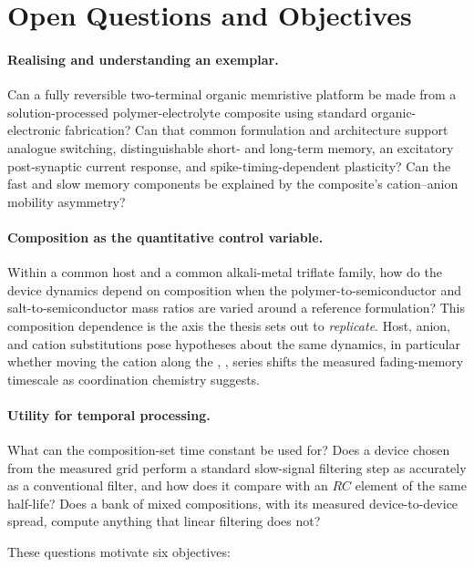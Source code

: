 \documentclass[12pt, twoside]{report}
\begin{document}
\section*{Open Questions and Objectives}
\label{subsec:open_questions}

\paragraph{Realising and understanding an exemplar.} Can a fully reversible two-terminal organic memristive platform be made from a solution-processed polymer-electrolyte composite using standard organic-electronic fabrication? Can that common formulation and architecture support analogue switching, distinguishable short- and long-term memory, an excitatory post-synaptic current response, and spike-timing-dependent plasticity? Can the fast and slow memory components be explained by the composite's cation--anion mobility asymmetry?

\paragraph{Composition as the quantitative control variable.} Within a common host and a common alkali-metal triflate family, how do the device dynamics depend on composition when the polymer-to-semiconductor and salt-to-semiconductor mass ratios are varied around a reference formulation? This composition dependence is the axis the thesis sets out to \emph{replicate}. Host, anion, and cation substitutions pose hypotheses about the same dynamics, in particular whether moving the cation along the , ,  series shifts the measured fading-memory timescale as coordination chemistry suggests.

\paragraph{Utility for temporal processing.} What can the composition-set time constant be used for? Does a device chosen from the measured grid perform a standard slow-signal filtering step as accurately as a conventional filter, and how does it compare with an $RC$ element of the same half-life? Does a bank of mixed compositions, with its measured device-to-device spread, compute anything that linear filtering does not?

These questions motivate six objectives:
\end{document}
